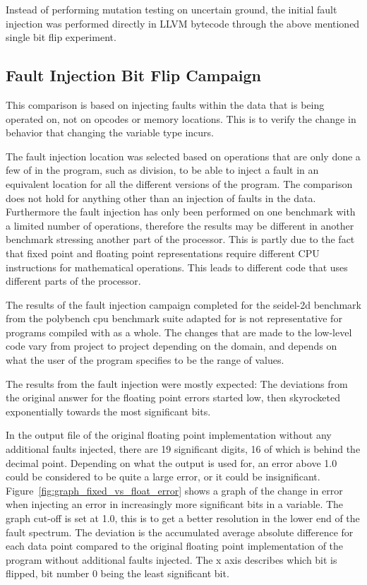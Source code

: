 Instead of performing mutation testing on uncertain ground, the initial fault injection was performed directly in LLVM bytecode through the above mentioned single bit flip experiment.

\subsection{Fault Injection Bit Flip Campaign}

This comparison is based on injecting faults within the data that is being operated on, not on opcodes or memory locations. This is to verify the change in behavior that changing the variable type incurs.

The fault injection location was selected based on operations that are only done a few of in the program, such as division, to be able to inject a fault in an equivalent location for all the different versions of the program. The comparison does not hold for anything other than an injection of faults in the data. Furthermore the fault injection has only been performed on one benchmark with a limited number of operations, therefore the results may be different in another benchmark stressing another part of the processor. This is partly due to the fact that fixed point and floating point representations require different CPU instructions for mathematical operations. This leads to different code that uses different parts of the processor. 


The results of the fault injection campaign completed for the seidel-2d benchmark from the polybench cpu benchmark suite adapted for \taffo{} is not representative for programs compiled with \taffo{} as a whole. The changes that are made to the low-level code vary from project to project depending on the domain, and depends on what the user of the program specifies to be the range of values. 

The results from the fault injection were mostly expected: The deviations from the original answer for the floating point errors started low, then skyrocketed exponentially towards the most significant bits.






In the output file of the original floating point implementation without any additional faults injected, there are 19 significant digits, 16 of which is behind the decimal point. Depending on what the output is used for, an error above 1.0 could be considered to be quite a large error, or it could be insignificant. Figure~\ref{fig:graph_fixed_vs_float_error} shows a graph of the change in error when injecting an error in increasingly more significant bits in a variable. The graph cut-off is set at 1.0, this is to get a better resolution in the lower end of the fault spectrum. The deviation is the accumulated average absolute difference for each data point compared to the original floating point implementation of the program without additional faults injected. The x axis describes which bit is flipped, bit number 0 being the least significant bit.

